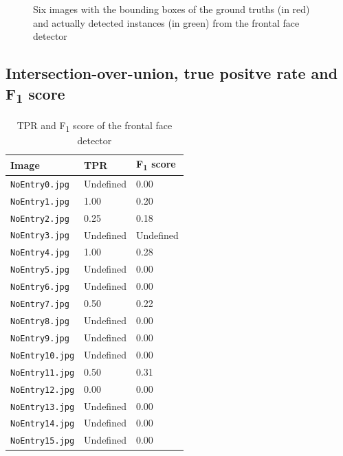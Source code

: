 \documentclass[twocolumn, 10pt, a4paper]{article}
\begin{document}
\begin{figure}[htbp]
  \hfill
  \hfill
  \caption{Six images with the bounding boxes of the ground truths (in red) and actually detected instances (in green) from the frontal face detector}\label{fig:face}
\end{figure}

\subsection{Intersection-over-union, true positve rate and F\textsubscript{1} score}

\begin{table}[htbp]
  \begin{center}
  \caption{TPR and F\textsubscript{1} score of the frontal face detector}\label{tab:face}
  \begin{tabular}{l | l l} 
    \hline\hline
    Image&TPR&F\textsubscript{1} score\\
    \hline
    \texttt{NoEntry0.jpg}&Undefined&0.00\\ 
    \texttt{NoEntry1.jpg}&1.00&0.20\\ 
    \texttt{NoEntry2.jpg}&0.25&0.18\\ 
    \texttt{NoEntry3.jpg}&Undefined&Undefined\\ 
    \texttt{NoEntry4.jpg}&1.00&0.28\\ 
    \texttt{NoEntry5.jpg}&Undefined&0.00\\ 
    \texttt{NoEntry6.jpg}&Undefined&0.00\\ 
    \texttt{NoEntry7.jpg}&0.50&0.22\\ 
    \texttt{NoEntry8.jpg}&Undefined&0.00\\ 
    \texttt{NoEntry9.jpg}&Undefined&0.00\\ 
    \texttt{NoEntry10.jpg}&Undefined&0.00\\ 
    \texttt{NoEntry11.jpg}&0.50&0.31\\ 
    \texttt{NoEntry12.jpg}&0.00&0.00\\ 
    \texttt{NoEntry13.jpg}&Undefined&0.00\\ 
    \texttt{NoEntry14.jpg}&Undefined&0.00\\ 
    \texttt{NoEntry15.jpg}&Undefined&0.00\\ 
    \hline
  \end{tabular}
  \end{center}
\end{table} 
\end{document}

